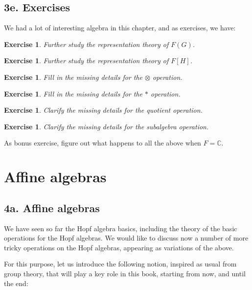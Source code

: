 \documentclass[12pt]{amsbook}
\newtheorem{exercise}[theorem]{Exercise}
\begin{document}
\section*{3e. Exercises}

We had a lot of interesting algebra in this chapter, and as exercises, we have:

\begin{exercise}
Further study the representation theory of $F(G)$.
\end{exercise}

\begin{exercise}
Further study the representation theory of $F[H]$.
\end{exercise}

\begin{exercise}
Fill in the missing details for the $\otimes$ operation.
\end{exercise}

\begin{exercise}
Fill in the missing details for the $*$ operation.
\end{exercise}

\begin{exercise}
Clarify the missing details for the quotient operation.
\end{exercise}

\begin{exercise}
Clarify the missing details for the subalgebra operation.
\end{exercise}

As bonus exercise, figure out what happens to all the above when $F=\mathbb C$.

\chapter{Affine algebras}

\section*{4a. Affine algebras}

We have seen so far the Hopf algebra basics, including the theory of the basic operations for the Hopf algebras. We would like to discuss now a number of more tricky operations on the Hopf algebras, appearing as variations of the above. 

\bigskip

For this purpose, let us introduce the following notion, inspired as usual from group theory, that will play a key role in this book, starting from now, and until the end:
\end{document}
